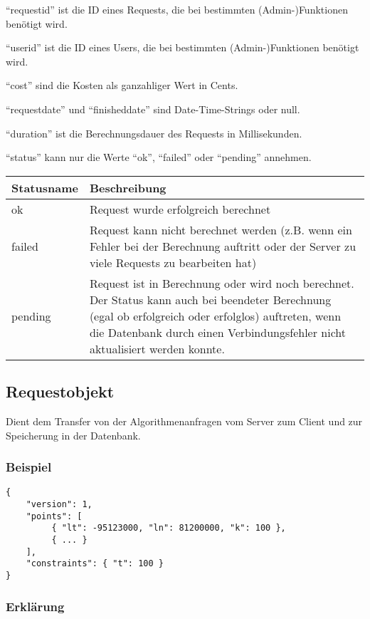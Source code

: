 \documentclass[ngerman,titlepage,parskip=true]{scrartcl}
\begin{document}
	``requestid'' ist die ID eines Requests, die bei bestimmten (Admin-)Funktionen benötigt wird.

	``userid'' ist die ID eines Users, die bei bestimmten (Admin-)Funktionen benötigt wird.
	
	
	``cost'' sind die Kosten als ganzahliger Wert in Cents.

	``requestdate'' und ``finisheddate'' sind Date-Time-Strings oder null.
	
	``duration'' ist die Berechnungsdauer des Requests in Millisekunden.
	
	``status'' kann nur die Werte ``ok'', ``failed'' oder ``pending'' annehmen.
	
	\begin{tabular}{|p{}|p{}|}
	\hline
	Statusname 	& Beschreibung \\\hline
	ok 			& Request wurde erfolgreich berechnet\\
	failed 		& Request kann nicht berechnet werden (z.B. wenn ein Fehler bei der Berechnung auftritt oder der Server zu viele Requests zu bearbeiten hat)\\
	pending 	& Request ist in Berechnung oder wird noch berechnet. Der Status kann auch bei beendeter Berechnung (egal ob erfolgreich oder erfolglos) auftreten, wenn die Datenbank durch einen Verbindungsfehler nicht aktualisiert werden konnte. \\
	\hline
	\end{tabular}	

\subsection{Requestobjekt}	

	Dient dem Transfer von der Algorithmenanfragen vom Server zum Client und zur Speicherung in der Datenbank.
\label{requestobjekt}
\subsubsection{Beispiel}
\begin{lstlisting}
{
    "version": 1,
    "points": [
         { "lt": -95123000, "ln": 81200000, "k": 100 },
         { ... }
    ],
    "constraints": { "t": 100 }
}    	
	\end{lstlisting}
	
		\subsubsection*{Erklärung}
	
\end{document}
